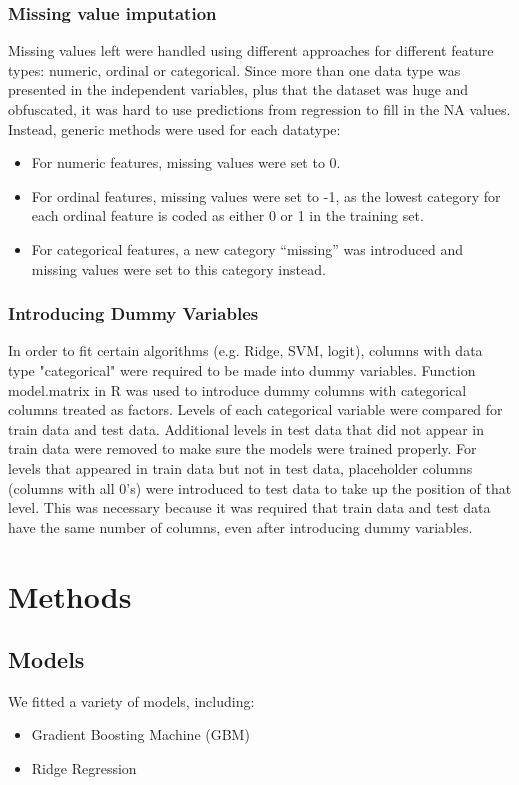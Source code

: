 \documentclass{article}\usepackage[]{graphicx}\usepackage[]{color}
\begin{document}
\subsubsection{Missing value imputation}
Missing values left were handled using different approaches for different feature types: numeric, ordinal or categorical. Since more than one data type was presented in the independent variables, plus that the dataset was huge and obfuscated, it was hard to use predictions from regression to fill in the NA values. Instead, generic methods were used for each datatype:
\begin{itemize}
  \item For numeric features, missing values were set to 0.
  \item For ordinal features, missing values were set to -1, as the lowest category for each ordinal feature is coded as either 0 or 1 in the training set.
  \item For categorical features, a new category ``missing'' was introduced and missing values were set to this category instead.
\end{itemize}

\subsubsection{Introducing Dummy Variables}
In order to fit certain algorithms (e.g. Ridge, SVM, logit), columns with data type "categorical" were required to be made into dummy variables. Function model.matrix in R was used to introduce dummy columns with categorical columns treated as factors.
Levels of each categorical variable were compared for train data and test data. Additional levels in test data that did not appear in train data were removed to make sure the models were trained properly. For levels that appeared in train data but not in test data, placeholder columns (columns with all 0's) were introduced to test data to take up the position of that level. This was necessary because it was required that train data and test data have the same number of columns, even after introducing dummy variables.

\section{Methods}
\label{sec:methods}

\subsection{Models}
We fitted a variety of models, including:
\begin{itemize}
  \item Gradient Boosting Machine (GBM)
\end{itemize}
\begin{itemize}
  \item Ridge Regression
\end{itemize}
\end{document}
